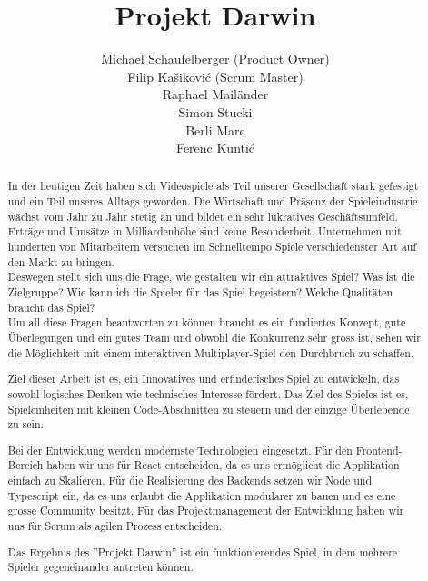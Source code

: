 \documentclass[11pt,a4paper,titlepage]{article}
\author{Michael Schaufelberger (Product Owner)\\
Filip Kašiković (Scrum Master)\\
Raphael Mailänder\\
Simon Stucki\\
Berli Marc\\
Ferenc Kuntić}
\title{Projekt Darwin}
\begin{document}
\maketitle


\begin{abstract}

In der heutigen Zeit haben sich Videospiele als Teil unserer Gesellschaft stark gefestigt und ein Teil unseres Alltags geworden. Die Wirtschaft und Präsenz der Spieleindustrie wächst vom Jahr zu Jahr stetig an und bildet ein sehr lukratives Geschäftsumfeld. Erträge und Umsätze in Milliardenhöhe sind keine Besonderheit. Unternehmen mit hunderten von Mitarbeitern versuchen im Schnelltempo Spiele verschiedenster Art auf den Markt zu bringen. 
\\Deswegen stellt sich uns die Frage, wie gestalten wir ein attraktives Spiel? Was ist die Zielgruppe? Wie kann ich die Spieler für das Spiel begeistern? Welche Qualitäten braucht das Spiel?
\\Um all diese Fragen beantworten zu können braucht es ein fundiertes Konzept, gute Überlegungen und ein gutes Team und obwohl die Konkurrenz sehr gross ist, sehen wir die Möglichkeit mit einem interaktiven Multiplayer-Spiel den Durchbruch zu schaffen.

Ziel dieser Arbeit ist es, ein Innovatives und erfinderisches Spiel zu entwickeln, das sowohl logisches Denken wie technisches Interesse fördert. Das Ziel des Spieles ist es, Spieleinheiten mit kleinen Code-Abschnitten zu steuern und der einzige Überlebende zu sein.

Bei der Entwicklung werden modernste Technologien eingesetzt. Für den Frontend-Bereich haben wir uns für React entscheiden, da es uns ermöglicht die Applikation einfach zu Skalieren. Für die Realisierung des Backends setzen wir Node und Typescript ein, da es uns erlaubt die Applikation modularer zu bauen und es eine grosse Community besitzt.
Für das Projektmanagement der Entwicklung haben wir uns für Scrum als agilen Prozess entscheiden.

Das Ergebnis des ''Projekt Darwin'' ist ein funktionierendes Spiel, in dem mehrere Spieler gegeneinander antreten können.

\end{abstract}
\end{document}
